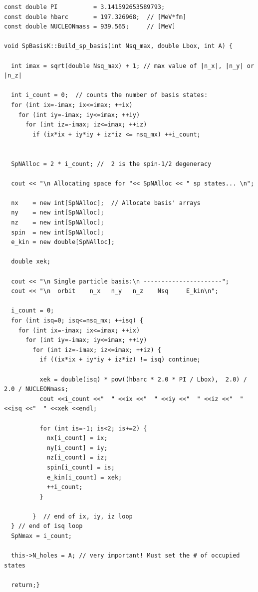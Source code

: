 \lstset{language=c++}
\begin{lstlisting}
const double PI          = 3.141592653589793; 
const double hbarc       = 197.326968;  // [MeV*fm]
const double NUCLEONmass = 939.565;     // [MeV]

void SpBasisK::Build_sp_basis(int Nsq_max, double Lbox, int A) {

  int imax = sqrt(double Nsq_max) + 1; // max value of |n_x|, |n_y| or |n_z|
  
  int i_count = 0;  // counts the number of basis states:
  for (int ix=-imax; ix<=imax; ++ix)
    for (int iy=-imax; iy<=imax; ++iy)
      for (int iz=-imax; iz<=imax; ++iz)
        if (ix*ix + iy*iy + iz*iz <= nsq_mx) ++i_count;
  
  
  SpNAlloc = 2 * i_count; //  2 is the spin-1/2 degeneracy
  
  cout << "\n Allocating space for "<< SpNAlloc << " sp states... \n";
  
  nx    = new int[SpNAlloc];  // Allocate basis' arrays
  ny    = new int[SpNAlloc];
  nz    = new int[SpNAlloc];
  spin  = new int[SpNAlloc];
  e_kin = new double[SpNAlloc];
  
  double xek;
  
  cout << "\n Single particle basis:\n ----------------------";
  cout << "\n  orbit    n_x   n_y   n_z    Nsq     E_kin\n";
  
  i_count = 0;
  for (int isq=0; isq<=nsq_mx; ++isq) {
    for (int ix=-imax; ix<=imax; ++ix)
      for (int iy=-imax; iy<=imax; ++iy)
        for (int iz=-imax; iz<=imax; ++iz) {
          if ((ix*ix + iy*iy + iz*iz) != isq) continue;
          
          xek = double(isq) * pow((hbarc * 2.0 * PI / Lbox),  2.0) / 2.0 / NUCLEONmass;
          cout <<i_count <<"  " <<ix <<"  " <<iy <<"  " <<iz <<"  " <<isq <<"  " <<xek <<endl;
          
          for (int is=-1; is<2; is+=2) {
            nx[i_count] = ix;
            ny[i_count] = iy;
            nz[i_count] = iz;
            spin[i_count] = is;
            e_kin[i_count] = xek;
            ++i_count;
          }
          
        }  // end of ix, iy, iz loop
  } // end of isq loop
  SpNmax = i_count;

  this->N_holes = A; // very important! Must set the # of occupied states

  return;}
\end{lstlisting}




